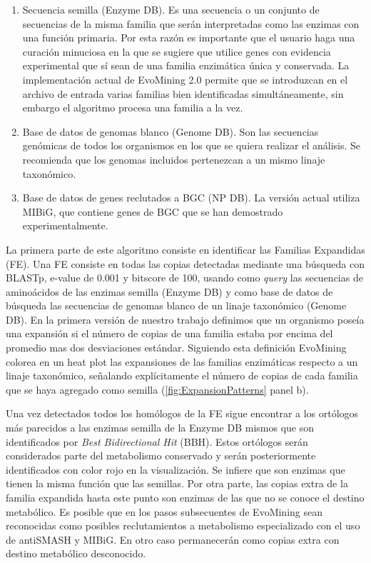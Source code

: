 \documentclass[12pt,twoside]{reedthesis}
\begin{document}
  \begin{enumerate}
  \def\labelenumi{\alph{enumi})}
  \item
    Secuencia semilla (Enzyme DB). Es una secuencia o un conjunto de
    secuencias de la misma familia que serán interpretadas como las
    enzimas con una función primaria. Por esta razón es importante que el
    usuario haga una curación minuciosa en la que se sugiere que utilice
    genes con evidencia experimental que sí sean de una familia enzimática
    única y conservada. La implementación actual de EvoMining 2.0 permite
    que se introduzcan en el archivo de entrada varias familias bien
    identificadas simultáneamente, sin embargo el algoritmo procesa una
    familia a la vez.
  \item
    Base de datos de genomas blanco (Genome DB). Son las secuencias
    genómicas de todos los organismos en los que se quiera realizar el
    análisis. Se recomienda que los genomas incluidos pertenezcan a un
    mismo linaje taxonómico.
  \item
    Base de datos de genes reclutados a BGC (NP DB). La versión actual
    utiliza MIBiG, que contiene genes de BGC que se han demostrado
    experimentalmente.
  \end{enumerate}
  
  La primera parte de este algoritmo consiste en identificar las Familias
  Expandidas (FE). Una FE consiste en todas las copias detectadas mediante
  una búsqueda con BLASTp, e-value de 0.001 y bitscore de 100, usando como
  \emph{query} las secuencias de aminoácidos de las enzimas semilla
  (Enzyme DB) y como base de datos de búsqueda las secuencias de genomas
  blanco de un linaje taxonómico (Genome DB). En la primera versión de
  nuestro trabajo definimos que un organismo poseía una expansión si el
  número de copias de una familia estaba por encima del promedio mas dos
  desviaciones estándar. Siguiendo esta definición EvoMining colorea en un
  heat plot las expansiones de las familias enzimáticas respecto a un
  linaje taxonómico, señalando explícitamente el número de copias de cada
  familia que se haya agregado como semilla
  (\autoref{fig:ExpansionPatterns} panel b).
  
  Una vez detectados todos los homólogos de la FE sigue encontrar a los
  ortólogos más parecidos a las enzimas semilla de la Enzyme DB mismos que
  son identificados por \emph{Best Bidirectional Hit} (BBH). Estos
  ortólogos serán considerados parte del metabolismo conservado y serán
  posteriormente identificados con color rojo en la visualización. Se
  infiere que son enzimas que tienen la misma función que las semillas.
  Por otra parte, las copias extra de la familia expandida hasta este
  punto son enzimas de las que no se conoce el destino metabólico. Es
  posible que en los pasos subsecuentes de EvoMining sean reconocidas como
  posibles reclutamientos a metabolismo especializado con el uso de
  antiSMASH y MIBiG. En otro caso permanecerán como copias extra con
  destino metabólico desconocido.
  
\end{document}
